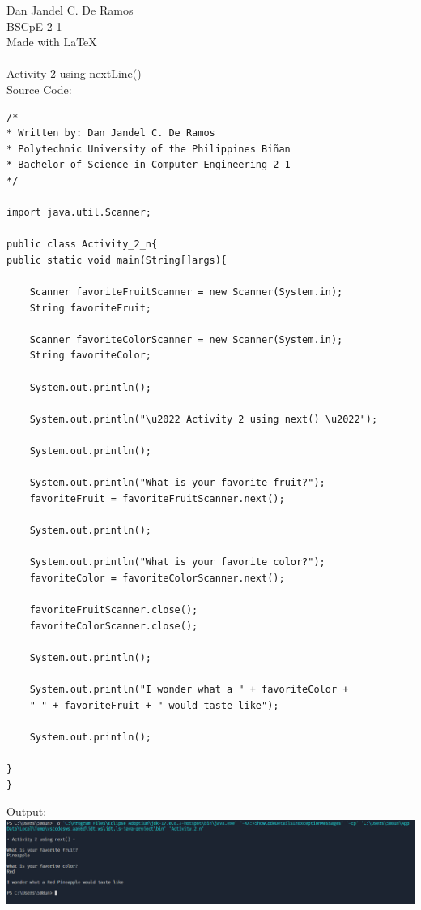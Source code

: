 \documentclass[12pt]{article}
\begin{document}
 
	\noindent
	Dan Jandel C. De Ramos\\
	BSCpE 2-1\\
	Made with \LaTeX \\
	\\
	Activity 2 using nextLine()\\
	Source Code:
			
	\begin{verbatim}         
/*
* Written by: Dan Jandel C. De Ramos
* Polytechnic University of the Philippines Biñan
* Bachelor of Science in Computer Engineering 2-1
*/

import java.util.Scanner;

public class Activity_2_n{
public static void main(String[]args){
	
	Scanner favoriteFruitScanner = new Scanner(System.in);
	String favoriteFruit;
	
	Scanner favoriteColorScanner = new Scanner(System.in);
	String favoriteColor;
	
	System.out.println();
	
	System.out.println("\u2022 Activity 2 using next() \u2022");
	
	System.out.println();
	
	System.out.println("What is your favorite fruit?");
	favoriteFruit = favoriteFruitScanner.next();    
	
	System.out.println();
	
	System.out.println("What is your favorite color?");
	favoriteColor = favoriteColorScanner.next();
	
	favoriteFruitScanner.close();
	favoriteColorScanner.close();
	
	System.out.println();        
	
	System.out.println("I wonder what a " + favoriteColor +
	" " + favoriteFruit + " would taste like");
	
	System.out.println();
	
}
}
	\end{verbatim}
	\clearpage
	\noindent
	Output:\\
	\includegraphics[width=\textwidth]{output2n}
\end{document}

